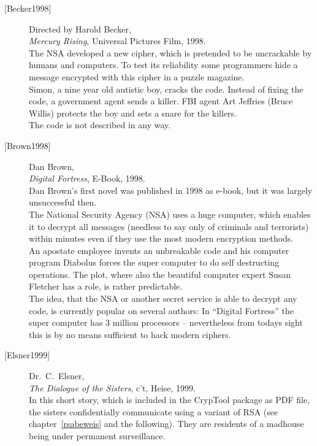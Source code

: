 \begin{description}
\item[\textrm{[Becker1998]}] 
    Directed by Harold Becker, \\
    {\em Mercury Rising}, Universal Pictures Film, 1998. \\
    The NSA developed a new cipher, which is pretended to be uncrackable by
    humans and computers. To test its reliability some programmers hide a
    message encrypted with this cipher in a puzzle magazine.\\
    Simon, a nine year old autistic boy, cracks the code. Instead of
    fixing the code, a government agent sends a killer. FBI agent Art
    Jeffries (Bruce Willis) protects the boy and sets a snare for the
    killers.\\    
    The code is not described in any way.\\


\item[\textrm{[Brown1998]}] 
    Dan Brown, \\
    {\em Digital Fortress}, E-Book, 1998. \\
    Dan Brown's first novel was published in 1998 as e-book, but it was
    largely unsuccessful then.\\
    The National Security Agency (NSA) uses a huge computer, which enables it
    to decrypt all messages (needless to say only of criminals and terrorists)
    within minutes even if they use the most modern encryption methods.\\
    An apostate employee invents an unbreakable code and his computer program
    Diabolus forces the super computer to do self destructing operations.
    The plot, where also the beautiful computer expert Susan Fletcher has a
    role, is rather predictable.\\
    The idea, that the NSA or another secret service is able to decrypt any
    code, is currently popular on several authors: In ``Digital Fortress'' the
    super computer has 3 million processors -- nevertheless from todays sight
    this is by no means sufficient to hack modern ciphers.\\


\item[\textrm{[Elsner1999]}] 
    Dr.~C.~Elsner, \\
    {\em The Dialogue of the Sisters}, c't, Heise, 1999. \\
    In this short story, which is included in the CrypTool package
     as PDF file, the sisters confidentially communicate
    using a variant of RSA (see chapter~\ref{rsabeweis} and the following).
    They are residents of a madhouse being under permanent surveillance.\\



\end{description}
